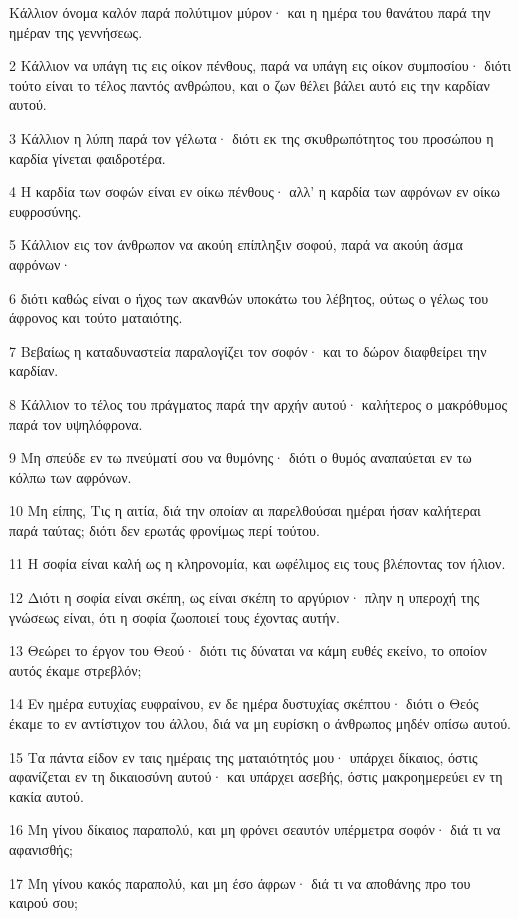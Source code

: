 \par Κάλλιον όνομα καλόν παρά πολύτιμον μύρον· και η ημέρα του θανάτου παρά την ημέραν της γεννήσεως.
\par 2 Κάλλιον να υπάγη τις εις οίκον πένθους, παρά να υπάγη εις οίκον συμποσίου· διότι τούτο είναι το τέλος παντός ανθρώπου, και ο ζων θέλει βάλει αυτό εις την καρδίαν αυτού.
\par 3 Κάλλιον η λύπη παρά τον γέλωτα· διότι εκ της σκυθρωπότητος του προσώπου η καρδία γίνεται φαιδροτέρα.
\par 4 Η καρδία των σοφών είναι εν οίκω πένθους· αλλ' η καρδία των αφρόνων εν οίκω ευφροσύνης.
\par 5 Κάλλιον εις τον άνθρωπον να ακούη επίπληξιν σοφού, παρά να ακούη άσμα αφρόνων·
\par 6 διότι καθώς είναι ο ήχος των ακανθών υποκάτω του λέβητος, ούτως ο γέλως του άφρονος και τούτο ματαιότης.
\par 7 Βεβαίως η καταδυναστεία παραλογίζει τον σοφόν· και το δώρον διαφθείρει την καρδίαν.
\par 8 Κάλλιον το τέλος του πράγματος παρά την αρχήν αυτού· καλήτερος ο μακρόθυμος παρά τον υψηλόφρονα.
\par 9 Μη σπεύδε εν τω πνεύματί σου να θυμόνης· διότι ο θυμός αναπαύεται εν τω κόλπω των αφρόνων.
\par 10 Μη είπης, Τις η αιτία, διά την οποίαν αι παρελθούσαι ημέραι ήσαν καλήτεραι παρά ταύτας; διότι δεν ερωτάς φρονίμως περί τούτου.
\par 11 Η σοφία είναι καλή ως η κληρονομία, και ωφέλιμος εις τους βλέποντας τον ήλιον.
\par 12 Διότι η σοφία είναι σκέπη, ως είναι σκέπη το αργύριον· πλην η υπεροχή της γνώσεως είναι, ότι η σοφία ζωοποιεί τους έχοντας αυτήν.
\par 13 Θεώρει το έργον του Θεού· διότι τις δύναται να κάμη ευθές εκείνο, το οποίον αυτός έκαμε στρεβλόν;
\par 14 Εν ημέρα ευτυχίας ευφραίνου, εν δε ημέρα δυστυχίας σκέπτου· διότι ο Θεός έκαμε το εν αντίστιχον του άλλου, διά να μη ευρίσκη ο άνθρωπος μηδέν οπίσω αυτού.
\par 15 Τα πάντα είδον εν ταις ημέραις της ματαιότητός μου· υπάρχει δίκαιος, όστις αφανίζεται εν τη δικαιοσύνη αυτού· και υπάρχει ασεβής, όστις μακροημερεύει εν τη κακία αυτού.
\par 16 Μη γίνου δίκαιος παραπολύ, και μη φρόνει σεαυτόν υπέρμετρα σοφόν· διά τι να αφανισθής;
\par 17 Μη γίνου κακός παραπολύ, και μη έσο άφρων· διά τι να αποθάνης προ του καιρού σου;
